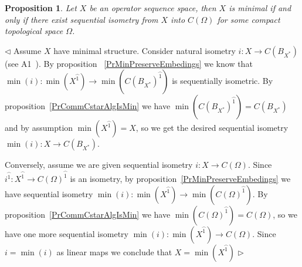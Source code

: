 \documentclass[12pt]{article}
\newtheorem{proposition}[theorem]{Proposition}
\newenvironment{proof}{\par $\triangleleft$}{$\triangleright$}
\begin{document}
\begin{proposition}\label{PrMinIsSubspOfCommCstarAlg} Let $X$ be an operator 
sequence space, then $X$ is minimal if and only if there exist sequential 
isometry from $X$ into $C(\Omega)$ for some compact topological space $\Omega$.
\end{proposition}
\begin{proof} 
Assume $X$ have minimal structure. Consider natural 
isometry $i:X\to C(B_{X^*})$ (see A1~\cite{DefFloTensNorOpId}). By proposition 
~\ref{PrMinPreserveEmbedings} we know that 
$\min(i):\min(X^{\wideparen{1}})\to\min({C(B_{X^*})}^{\wideparen{1}})$ is 
sequentially isometric. By proposition~\ref{PrCommCstarAlgIsMin} we 
have $\min({C(B_{X^*})}^{\wideparen{1}})=C(B_{X^*})$ and by 
assumption $\min(X^{\wideparen{1}})=X$, so we get the desired sequential 
isometry $\min(i):X\to C(B_{X^*})$.

Conversely, assume we are given sequential isometry $i:X\to C(\Omega)$. 
Since $i^{\wideparen{1}}:X^{\wideparen{1}}\to {C(\Omega)}^{\wideparen{1}}$ is 
an isometry, by proposition~\ref{PrMinPreserveEmbedings} we have sequential 
isometry $\min(i):\min(X^{\wideparen{1}})\to\min({C(\Omega)}^{\wideparen{1}})$. 
By proposition~\ref{PrCommCstarAlgIsMin} 
we have $\min({C(\Omega)}^{\wideparen{1}})=C(\Omega)$, so we have one more 
sequential isometry $\min(i):\min(X^{\wideparen{1}})\to C(\Omega)$. 
Since $i=\min(i)$ as linear maps we conclude that $X=\min(X^{\wideparen{1}})$ 
\end{proof}
\end{document}
